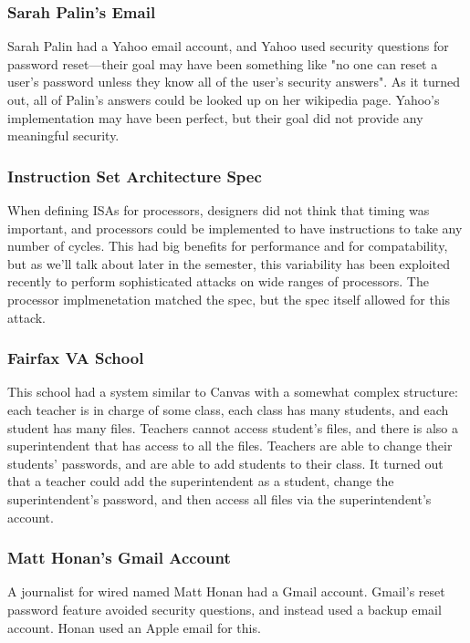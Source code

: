 \subsubsection{Sarah Palin's Email}
Sarah Palin had a Yahoo email account, and Yahoo used security questions for password reset---their goal may have been something like "no one can reset a user's password unless they know all of the user's security answers". As it turned out, all of Palin's answers could be looked up on her wikipedia page. Yahoo's implementation may have been perfect, but their goal did not provide any meaningful security.

\subsubsection{Instruction Set Architecture Spec}
When defining ISAs for processors, designers did not think that timing was important, and processors could be implemented to have instructions to take any number of cycles. This had big benefits for performance and for compatability, but as we'll talk about later in the semester, this variability has been exploited recently to perform sophisticated attacks on wide ranges of processors. The processor implmenetation matched the spec, but the spec itself allowed for this attack.

\subsubsection{Fairfax VA School}
This school had a system similar to Canvas with a somewhat complex structure: each teacher is in charge of some class, each class has many students, and each student has many files. Teachers cannot access student's files, and there is also a superintendent that has access to all the files. Teachers are able to change their students' passwords, and are able to add students to their class. It turned out that a teacher could add the superintendent as a student, change the superintendent's password, and then access all files via the superintendent's account.

\subsubsection{Matt Honan's Gmail Account}
A journalist for wired named Matt Honan had a Gmail account. Gmail's reset password feature avoided security questions, and instead used a backup email account. Honan used an Apple email for this.

